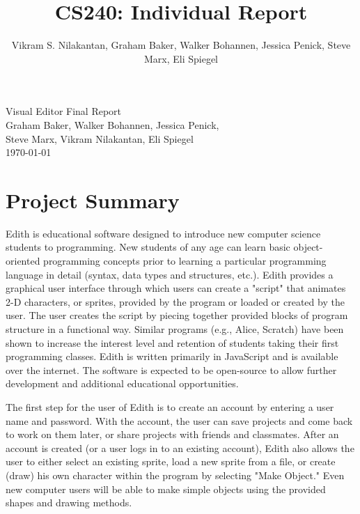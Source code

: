 \documentclass[a4paper]{article}
\title{CS240: Individual Report}
\author{Vikram S. Nilakantan, Graham Baker, Walker Bohannen, Jessica Penick, Steve Marx, Eli Spiegel}
\begin{document}

\begin{titlepage}
        \vspace*{\fill} %
        \begin{center}
                {\Huge Visual Editor Final Report}\\ [0.5cm]        
                
                {\Large Graham Baker, Walker Bohannen, Jessica Penick, \\Steve Marx, Vikram Nilakantan, Eli Spiegel}\\[0.4cm]
                \today %
        \end{center}
        \vspace*{\fill}
\end{titlepage}



\section{Project Summary}
Edith is educational software designed to introduce new computer science students to programming.  New students of any age can learn basic object-oriented programming concepts prior to learning a particular programming language in detail (syntax, data types and structures, etc.).  Edith provides a graphical user interface through which users can create a "script" that animates 2-D characters, or sprites, provided by the program or loaded or created by the user.  The user creates the script by piecing together provided blocks of program structure in a functional way.  Similar programs (e.g., Alice, Scratch) have been shown to increase the interest level and retention of students taking their first programming classes.  Edith is written primarily in JavaScript and is available over the internet.  The software is expected to be open-source to allow further development and additional educational opportunities. 

The first step for the user of Edith is to create an account by entering a user name and password.  With the account, the user can save projects and come back to work on them later, or share projects with friends and classmates.   After an account is created (or a user logs in to an existing account), Edith also allows the user to either select an existing sprite, load a new sprite from a file, or create (draw) his own character within the program by selecting "Make Object."  Even new computer users will be able to make simple objects using the provided shapes and drawing methods.         
\end{document}
